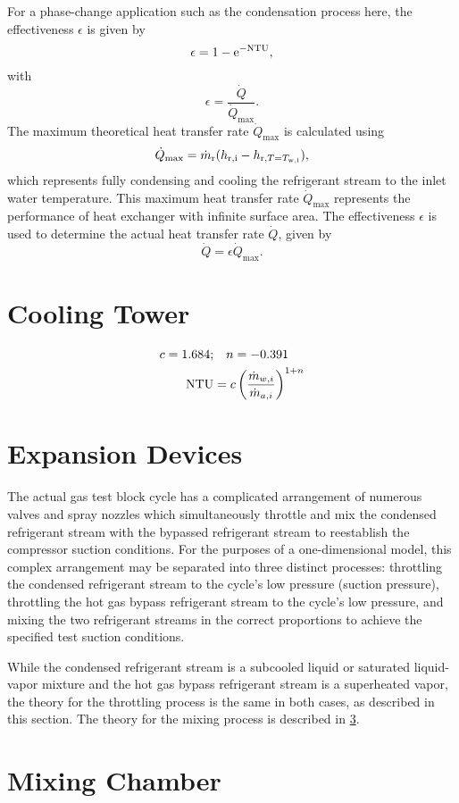 For a phase-change application such as the condensation process here, 
the effectiveness $\epsilon$ is given by
\begin{equation}
  \epsilon = 1 - \mathrm{e}^{-\mathrm{NTU}},
\end{equation}
with
\begin{equation}
  \epsilon = \frac{\dot{Q}}{\dot{Q}_{\max}}.
\end{equation}
The maximum theoretical heat transfer rate $\dot{Q}_{\max}$ is 
calculated using
\begin{equation}
  \dot{Q}_{\max} = \dot{m}_{\text{r}} (h_{\text{r},\text{i}} - h_{\text{r},T=T_{\text{w},\text{i}}}),
\end{equation}
which represents fully condensing and cooling the refrigerant stream to the
inlet water temperature. This maximum heat transfer rate $\dot{Q}_{\max}$ 
represents the performance of heat exchanger with infinite surface area.
The effectiveness $\epsilon$ is used to determine the actual heat transfer rate
$\dot{Q}$, given by
\begin{equation}
  \dot{Q} = \epsilon \dot{Q}_{\max}.
\end{equation}

\section{Cooling Tower} \label{sec:CoolingTower}
\begin{align*}
  c = 1.684; &\quad n = - 0.391 \\
  \mathrm{NTU} &= c\left(\frac{\dot{m}_{w,i}}{\dot{m}_{a,i}}\right)^{1 + n}
\end{align*}

\section{Expansion Devices} \label{sec:Expand}
The actual gas test block cycle has a complicated arrangement 
of numerous valves and spray nozzles which simultaneously throttle and mix 
the condensed refrigerant stream with the bypassed refrigerant stream 
to reestablish the compressor suction conditions.
For the purposes of a one-dimensional model, this complex arrangement
may be separated into three distinct processes: 
throttling the condensed refrigerant stream to the cycle's low pressure (suction pressure),
throttling the hot gas bypass refrigerant stream to the cycle's low pressure, and
mixing the two refrigerant streams in the correct proportions 
to achieve the specified test suction conditions.

While the condensed refrigerant stream is a subcooled liquid 
or saturated liquid-vapor mixture and the hot gas bypass refrigerant stream
is a superheated vapor, the theory for the throttling process is the same
in both cases, as described in this section.
The theory for the mixing process is described in \cref{sec:Mixing}.

\section{Mixing Chamber} \label{sec:Mixing}

